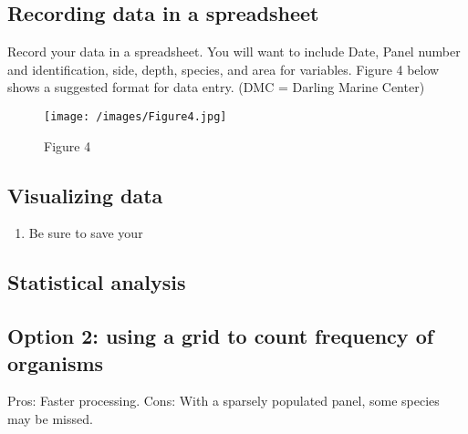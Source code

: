 \documentclass[]{article}
\providecommand{\tightlist}{%
  \setlength{\itemsep}{0pt}\setlength{\parskip}{0pt}}
\begin{document}
\subsection{Recording data in a
spreadsheet}\label{recording-data-in-a-spreadsheet}

Record your data in a spreadsheet. You will want to include Date, Panel
number and identification, side, depth, species, and area for variables.
Figure 4 below shows a suggested format for data entry. (DMC = Darling
Marine Center)

\begin{figure}
\centering
\texttt{[image: /images/Figure4.jpg]}
\caption{Figure 4}
\end{figure}

\subsection{Visualizing data}\label{visualizing-data}

\begin{enumerate}
\def\labelenumi{\arabic{enumi}.}
\tightlist
\item
  Be sure to save your
\end{enumerate}

\subsection{Statistical analysis}\label{statistical-analysis}

\subsection{Option 2: using a grid to count frequency of
organisms}\label{Option2}

Pros: Faster processing. Cons: With a sparsely populated panel, some
species may be missed.
\end{document}
